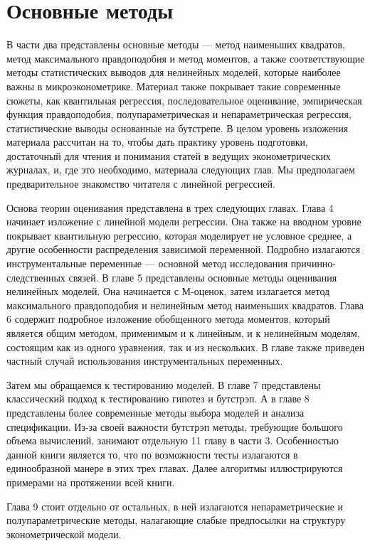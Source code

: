 \part{Основные методы}

В части два представлены основные методы --- метод наименьших квадратов, метод максимального правдоподобия и метод моментов, а также соответствующие методы статистических выводов для нелинейных моделей, которые наиболее важны в микроэконометрике. Материал также покрывает такие современные сюжеты, как квантильная регрессия, последовательное оценивание, эмпирическая функция правдоподобия, полупараметрическая и непараметрическая регрессия, статистические выводы основанные на бутстрепе. В целом уровень изложения материала рассчитан на то, чтобы дать практику уровень подготовки, достаточный для чтения и понимания статей в ведущих эконометрических журналах, и, где это необходимо, материала следующих глав. Мы предполагаем предварительное знакомство читателя с линейной регрессией.

Основа теории оценивания представлена в трех следующих главах. Глава 4 начинает изложение с линейной модели регрессии. Она также на вводном уровне покрывает квантильную регрессию, которая моделирует не условное среднее, а другие особенности распределения зависимой переменной. Подробно излагаются инструментальные переменные --- основной метод исследования причинно-следственных связей. В главе 5 представлены основные методы оценивания нелинейных моделей. Она начинается с М-оценок, затем излагается метод максимального правдоподобия и нелинейным метод наименьших квадратов. Глава 6 содержит подробное изложение обобщенного метода моментов, который является общим методом, применимым и к линейным, и к нелинейным моделям, состоящим как из одного уравнения, так и из нескольких. В главе также приведен частный случай использования инструментальных переменных.

Затем мы обращаемся к тестированию моделей. В главе 7 представлены классический подход к тестированию гипотез и бутстрэп. А в главе 8 представлены более современные методы выбора моделей и анализа спецификации. Из-за своей важности бутстрэп методы, требующие большого объема вычислений, занимают отдельную 11 главу в части 3. Особенностью данной книги является то, что по возможности тесты излагаются в единообразной манере в этих трех главах. Далее алгоритмы иллюстрируются примерами на протяжении всей книги. 

Глава 9 стоит отдельно от остальных, в ней излагаются непараметрические и полупараметрические методы, налагающие слабые предпосылки на структуру эконометрической модели.

